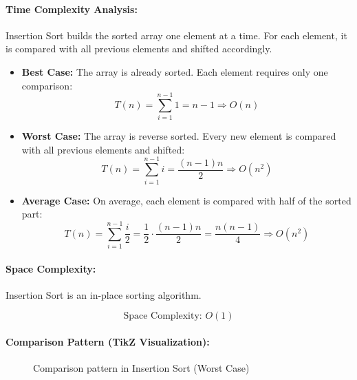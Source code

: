 \paragraph{Time Complexity Analysis:}

Insertion Sort builds the sorted array one element at a time. For each element, it is compared with all previous elements and shifted accordingly.

\begin{itemize}
  \item \textbf{Best Case:} The array is already sorted. Each element requires only one comparison:
  \[
  T(n) = \sum_{i=1}^{n-1} 1 = n - 1 \Rightarrow \boxed{O(n)}
  \]

  \item \textbf{Worst Case:} The array is reverse sorted. Every new element is compared with all previous elements and shifted:
  \[
  T(n) = \sum_{i=1}^{n-1} i = \frac{(n-1)n}{2} \Rightarrow \boxed{O(n^2)}
  \]

  \item \textbf{Average Case:} On average, each element is compared with half of the sorted part:
  \[
  T(n) = \sum_{i=1}^{n-1} \frac{i}{2} = \frac{1}{2} \cdot \frac{(n-1)n}{2} = \frac{n(n-1)}{4} \Rightarrow \boxed{O(n^2)}
  \]
\end{itemize}

\paragraph{Space Complexity:}

Insertion Sort is an in-place sorting algorithm.

\[
\boxed{\text{Space Complexity: } O(1)}
\]

\paragraph{Comparison Pattern (TikZ Visualization):}

\begin{figure}[H]
\centering
{}
\caption{Comparison pattern in Insertion Sort (Worst Case)}
\end{figure}

